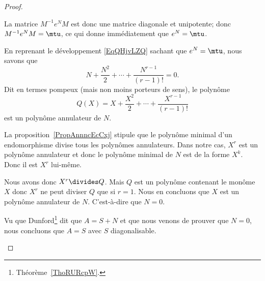 \begin{proof}
\begin{subproof}
		La matrice \( M^{-1}e^NM\) est donc une matrice diagonale et unipotente; donc \( M^{-1}e^NM=\mtu\), ce qui donne immédiatement que \( e^N=\mtu\).


		En reprenant le développement \eqref{EqQHjvLZQ} sachant que \( e^N=\mtu\), nous savons que
		\begin{equation}
			N+\frac{ N^2 }{2}+\cdots +\frac{ N^{r-1} }{ (r-1)! }=0.
		\end{equation}
		Dit en termes pompeux (mais non moins porteurs de sens), le polynôme
		\begin{equation}
			Q(X)=X+\frac{ X^2 }{2}+\cdots +\frac{ X^{r-1} }{ (r-1)! }
		\end{equation}
		est un polynôme annulateur de \( N\).

		La proposition~\ref{PropAnnncEcCxj} stipule que le polynôme minimal d'un endomorphisme divise tous les polynômes annulateurs. Dans notre cas, \( X^r\) est un polynôme annulateur et donc le polynôme minimal de \( N\) est de la forme \( X^k\). Donc il est \( X^r\) lui-même.

		Nous avons donc \( X^r\divides Q\). Mais \( Q\) est un polynôme contenant le monôme \( X\) donc \( X^r\) ne peut diviser \( Q\) que si \( r=1\). Nous en concluons que \( X\) est un polynôme annulateur de \( N\). C'est-à-dire que \( N=0\).

		\spitem[Conclusion]

		Vu que Dunford\footnote{Théorème~\ref{ThoRURcpW}.} dit que \( A=S+N\) et que nous venons de prouver que \( N=0\), nous concluons que \( A=S\) avec \( S\) diagonalisable.

	\end{subproof}
\end{proof}
